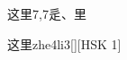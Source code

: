 \begin{entry}{这里}{7,7}{⾡、⾥}
  \begin{phonetics}{这里}{zhe4li3}[][HSK 1]
  \end{phonetics}
\end{entry}
